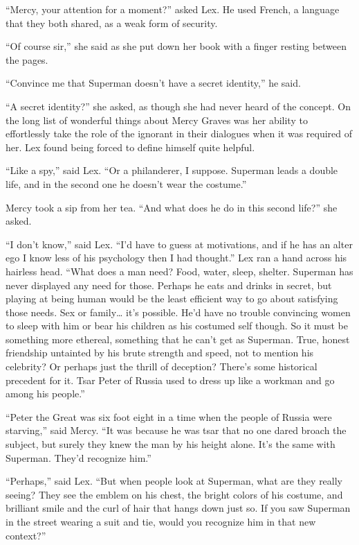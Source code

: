 \documentclass[ebook,12pt]{memoir}
\begin{document}
``Mercy, your attention for a moment?'' asked Lex. He used French, a
language that they both shared, as a weak form of security.

``Of course sir,'' she said as she put down her book with a finger
resting between the pages.

``Convince me that Superman doesn't have a secret identity,'' he said.

``A secret identity?'' she asked, as though she had never heard of the
concept. On the long list of wonderful things about Mercy Graves was her
ability to effortlessly take the role of the ignorant in their dialogues
when it was required of her. Lex found being forced to define himself
quite helpful.

``Like a spy,'' said Lex. ``Or a philanderer, I suppose. Superman leads
a double life, and in the second one he doesn't wear the costume.''

Mercy took a sip from her tea. ``And what does he do in this second
life?'' she asked.

``I don't know,'' said Lex. ``I'd have to guess at motivations, and if
he has an alter ego I know less of his psychology then I had thought.''
Lex ran a hand across his hairless head. ``What does a man need? Food,
water, sleep, shelter. Superman has never displayed any need for those.
Perhaps he eats and drinks in secret, but playing at being human would
be the least efficient way to go about satisfying those needs. Sex or
family\ldots{} it's possible. He'd have no trouble convincing women to
sleep with him or bear his children as his costumed self though. So it
must be something more ethereal, something that he can't get as
Superman. True, honest friendship untainted by his brute strength and
speed, not to mention his celebrity? Or perhaps just the thrill of
deception? There's some historical precedent for it. Tsar Peter of
Russia used to dress up like a workman and go among his people.''

``Peter the Great was six foot eight in a time when the people of Russia
were starving,'' said Mercy. ``It was because he was tsar that no one
dared broach the subject, but surely they knew the man by his height
alone. It's the same with Superman. They'd recognize him.''

``Perhaps,'' said Lex. ``But when people look at Superman, what are they
really seeing? They see the emblem on his chest, the bright colors of
his costume, and brilliant smile and the curl of hair that hangs down
just so. If you saw Superman in the street wearing a suit and tie, would
you recognize him in that new context?''
\end{document}
